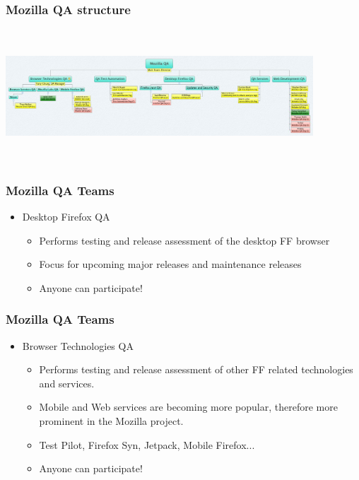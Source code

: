 \documentclass{beamer}
\begin{document}

\begin{frame}
\frametitle{Mozilla QA structure}
\begin{center}
 \includegraphics[height=5cm,width=11.5cm]{figs/MozillaQAOrgPic.jpg}
\begin{figure}
\end{figure}
\end{center}
\end{frame}


\begin{frame}
\frametitle{Mozilla QA Teams}
 \begin{itemize}
 \item Desktop Firefox QA
      \begin{itemize}
      \item Performs testing and release assessment of the desktop FF browser
      \item Focus for upcoming major releases and maintenance releases
      \item Anyone can participate!
      \end{itemize}
 \end{itemize}
\end{frame}


\begin{frame}
\frametitle{Mozilla QA Teams}
 \begin{itemize}
 \item Browser Technologies QA
      \begin{itemize}
      \item Performs testing and release assessment of other FF related technologies and services.
      \item Mobile and Web services are becoming more popular, therefore more prominent in the Mozilla project.
      \item Test Pilot, Firefox Syn, Jetpack, Mobile Firefox...
      \item Anyone can participate!
      \end{itemize}
 \end{itemize}
\end{frame}
\end{document}
